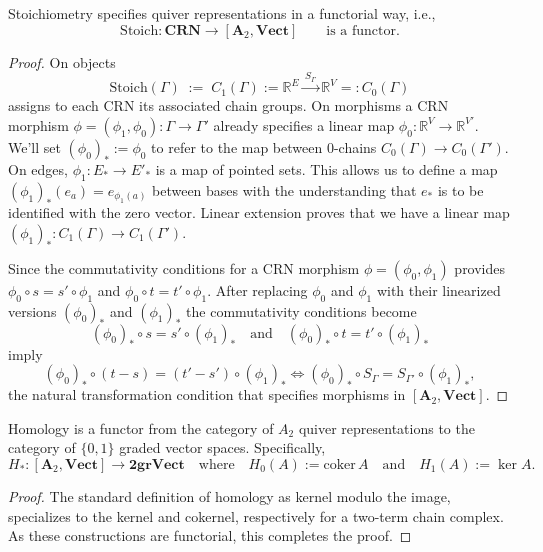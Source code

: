 \documentclass[11pt, one side, article]{memoir}
\newcommand{\R}{\mathbb{R}}
\begin{document}
\begin{proposition}\label{prop:quiver}
    Stoichiometry specifies quiver representations in a functorial way, i.e.,
    \[
        \mathrm{Stoich}:\mathbf{CRN}\longrightarrow [\mathbf{A}_2,\mathbf{Vect}] \qquad \text{is a functor.}
    \]
\end{proposition}
\begin{proof}
    On objects
    \[
    \mathrm{Stoich}(\Gamma)\;:=\;C_1(\Gamma) := \R^E \xrightarrow{\,S_\Gamma\,}\R^V =: C_0(\Gamma)
    \]
    assigns to each CRN its associated chain groups.
    On morphisms a CRN morphism $\phi=(\phi_1,\phi_0):\Gamma\to\Gamma'$ already specifies a linear map $\phi_0: \mathbb{R}^V\to \mathbb{R}^{V'}$.
    We'll set $(\phi_0)_* := \phi_0$ to refer to the map between $0$-chains $C_0(\Gamma)\to C_0(\Gamma')$.
    On edges, $\phi_1:E_*\to E'_*$ is a map of pointed sets.
    This allows us to define a map $(\phi_1)_*(e_a)=e_{\phi_1(a)}$ between bases with the understanding that $e_*$ is to be identified with the zero vector. Linear extension proves that we have a linear map $(\phi_1)_*:C_1(\Gamma)\to C_1(\Gamma')$.

    Since the commutativity conditions for a CRN morphism $\phi=(\phi_0,\phi_1)$ provides $\phi_0\circ s = s' \circ \phi_1$ and $\phi_0\circ t = t' \circ \phi_1$.
    After replacing $\phi_0$ and $\phi_1$ with their linearized versions $(\phi_0)_*$ and $(\phi_1)_*$ the commutativity conditions become
    \[
        (\phi_0)_*\circ s = s' \circ (\phi_1)_* \quad \text{and} \quad (\phi_0)_*\circ t = t' \circ (\phi_1)_*
    \]
    imply
    \[
        (\phi_0)_*\circ (t-s) = (t'-s') \circ (\phi_1)_* \Leftrightarrow (\phi_0)_*\circ S_{\Gamma} = S_{\Gamma'} \circ (\phi_1)_*,
    \]
    the natural transformation condition that specifies morphisms in $[\mathbf{A}_2,\mathbf{Vect}]$.
\end{proof}

\begin{proposition}\label{prop:homology}
    Homology is a functor from the category of $A_2$ quiver representations to the category of $\{0,1\}$ graded vector spaces. Specifically, 
    \[
        H_*:[\mathbf{A}_2,\mathbf{Vect}] \to \mathbf{2grVect} \quad \text{where} \quad H_0(A):=\mathrm{coker}\, A \quad \text{and}\quad  H_1(A):=\ker A.
    \]
\end{proposition}
\begin{proof}
    The standard definition of homology as kernel modulo the image, specializes to the kernel and cokernel, respectively for a two-term chain complex.
    As these constructions are functorial, this completes the proof.
\end{proof}
\end{document}
